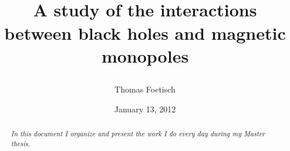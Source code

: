 \documentclass[10pt,a4paper,oneside]{article}
\title{\begin{small}\sc{Cosmology}\end{small}\\
  A study of the interactions between black holes and magnetic monopoles}
\author{Thomas Foetisch}
\date{January 13, 2012}
\begin{document}
\maketitle

\begin{abstract}
  \em{In this document I organize and present the work I do every day during my Master thesis.}
\end{abstract}

\tableofcontents
\newpage


\printbibliography
\end{document}
